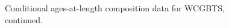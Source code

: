 \documentclass[
]{scrartcl}
\begin{document}
\begin{figure}[H]


\caption{\label{fig-caal_flt10_2}Conditional ages-at-length composition
data for WCGBTS, continued.}

\end{figure}%
\end{document}
